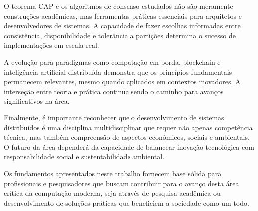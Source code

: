O teorema CAP e os algoritmos de consenso estudados não são meramente construções acadêmicas, mas ferramentas práticas essenciais para arquitetos e desenvolvedores de sistemas. A capacidade de fazer escolhas informadas entre consistência, disponibilidade e tolerância a partições determina o sucesso de implementações em escala real.

A evolução para paradigmas como computação em borda, blockchain e inteligência artificial distribuída demonstra que os princípios fundamentais permanecem relevantes, mesmo quando aplicados em contextos inovadores. A interseção entre teoria e prática continua sendo o caminho para avanços significativos na área.

Finalmente, é importante reconhecer que o desenvolvimento de sistemas distribuídos é uma disciplina multidisciplinar que requer não apenas competência técnica, mas também compreensão de aspectos econômicos, sociais e ambientais. O futuro da área dependerá da capacidade de balancear inovação tecnológica com responsabilidade social e sustentabilidade ambiental.

Os fundamentos apresentados neste trabalho fornecem base sólida para profissionais e pesquisadores que buscam contribuir para o avanço desta área crítica da computação moderna, seja através de pesquisa acadêmica ou desenvolvimento de soluções práticas que beneficiem a sociedade como um todo.
